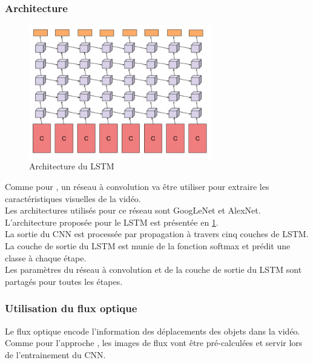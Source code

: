 \documentclass[11pt]{article}
\begin{document}
\subsubsection{Architecture}
\label{sec:orgfc6f7ab}
\begin{figure}[htbp]
\centering
\includegraphics[width=8cm]{cnn_lstm.PNG}
\caption{Architecture du LSTM \label{arch-lstm}}
\end{figure}
Comme pour \cite{DBLP:journals/corr/SimonyanZ14}, un réseau à convolution va être utiliser pour extraire les caractéristiques visuelles de la vidéo.\\
Les architectures utilisés pour ce réseau sont GoogLeNet et AlexNet.\\

L'architecture proposée pour le LSTM est présentée en \ref{arch-lstm}.\\
La sortie du CNN est processée par propagation à travers cinq couches de LSTM.\\
La couche de sortie du LSTM est munie de la fonction softmax et prédit une classe à chaque étape.\\
Les paramètres du réseau à convolution et de la couche de sortie du LSTM sont partagés pour toutes les étapes.\\

\subsubsection{Utilisation du flux optique}
\label{sec:org20235d6}
Le flux optique encode l'information des déplacements des objets dans la vidéo.\\
Comme pour l'approche \cite{DBLP:journals/corr/SimonyanZ14}, les images de flux vont être pré-calculées et servir lors de l'entrainement du CNN.\\
\end{document}
